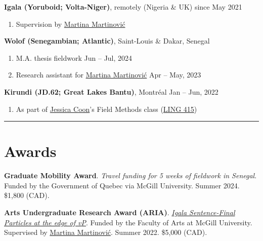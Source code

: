 \documentclass[margin,line]{resume}
\begin{document}
\begin{resume}
	\textbf{Igala (Yoruboid; Volta-Niger)}, remotely (Nigeria \& UK) \hfill since May 2021
	\begin{enumerate}[-, leftmargin=1em, topsep=4pt]
		\item[] Supervision by \href{https://inamartinovic.com/}{Martina Martinović}
	\end{enumerate}


	\textbf{Wolof (Senegambian; Atlantic)}, Saint-Louis \& Dakar, Senegal %
	\begin{enumerate}[-, leftmargin=1em, topsep=4pt]
		\item[] M.A. thesis fieldwork \hfill Jun -- Jul, 2024
		\item[] Research assistant for \href{https://inamartinovic.com/}{Martina Martinović} \hfill Apr -- May, 2023
	\end{enumerate}

	\textbf{Kirundi (JD.62; Great Lakes Bantu)}, Montréal \hfill Jan -- Jun, 2022
	\begin{enumerate}[-, leftmargin=1em, topsep=4pt]
		\item[] As part of \href{https://jessica.lingspace.org/}{Jessica Coon}'s Field Methods class (\href{https://www.mcgill.ca/study/2021-2022/courses/ling-415}{LING 415})
	\end{enumerate}

	\vspace{-0.9em}\rule{\textwidth}{0.4pt}


	\section{\mysidestyle Awards}

	
	{\textbf{Graduate Mobility Award}. \textit{Travel funding for 5 weeks of fieldwork in Senegal}. Funded by the Government of Quebec via McGill University. %
	Summer 2024. \$1,800 (CAD).}	
	
	{\textbf{Arts Undergraduate Research Award (ARIA)}. \href{https://www.mcgill.ca/arts-internships/files/arts-internships/brandon_chaperon.pdf}{\textit{Igala Sentence-Final Particles at the edge of \textit{v}P}}. Funded by the Faculty of Arts at McGill University. Supervised by \href{https://inamartinovic.com/}{Martina Martinović}. Summer 2022. \$5,000 (CAD).}


\end{resume}
\end{document}
